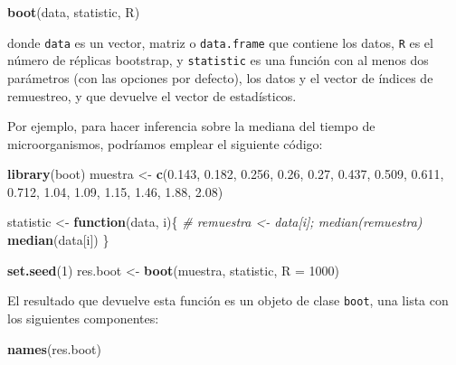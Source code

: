 \documentclass[
]{book}
\newenvironment{Shaded}{\begin{snugshade}}{\end{snugshade}}
\newcommand{\CommentTok}[1]{\textcolor[rgb]{0.56,0.35,0.01}{\textit{#1}}}
\newcommand{\ControlFlowTok}[1]{\textcolor[rgb]{0.13,0.29,0.53}{\textbf{#1}}}
\newcommand{\DataTypeTok}[1]{\textcolor[rgb]{0.13,0.29,0.53}{#1}}
\newcommand{\DecValTok}[1]{\textcolor[rgb]{0.00,0.00,0.81}{#1}}
\newcommand{\FloatTok}[1]{\textcolor[rgb]{0.00,0.00,0.81}{#1}}
\newcommand{\KeywordTok}[1]{\textcolor[rgb]{0.13,0.29,0.53}{\textbf{#1}}}
\newcommand{\NormalTok}[1]{#1}
\newcommand{\StringTok}[1]{\textcolor[rgb]{0.31,0.60,0.02}{#1}}
\theoremstyle{definition}
\theoremstyle{definition}
\theoremstyle{definition}
\theoremstyle{remark}
\begin{document}
\begin{Shaded}
\begin{Highlighting}[]
\KeywordTok{boot}\NormalTok{(data, statistic, R)}
\end{Highlighting}
\end{Shaded}

donde \texttt{data} es un vector, matriz o \texttt{data.frame} que contiene los datos,
\texttt{R} es el número de réplicas bootstrap, y \texttt{statistic} es una función
con al menos dos parámetros (con las opciones por defecto),
los datos y el vector de índices de remuestreo,
y que devuelve el vector de estadísticos.

Por ejemplo, para hacer inferencia sobre la mediana del tiempo de microorganismos,
podríamos emplear el siguiente código:

\begin{Shaded}
\begin{Highlighting}[]
\KeywordTok{library}\NormalTok{(boot)}
\NormalTok{muestra <-}\StringTok{ }\KeywordTok{c}\NormalTok{(}\FloatTok{0.143}\NormalTok{, }\FloatTok{0.182}\NormalTok{, }\FloatTok{0.256}\NormalTok{, }\FloatTok{0.26}\NormalTok{, }\FloatTok{0.27}\NormalTok{, }\FloatTok{0.437}\NormalTok{, }\FloatTok{0.509}\NormalTok{, }
             \FloatTok{0.611}\NormalTok{, }\FloatTok{0.712}\NormalTok{, }\FloatTok{1.04}\NormalTok{, }\FloatTok{1.09}\NormalTok{, }\FloatTok{1.15}\NormalTok{, }\FloatTok{1.46}\NormalTok{, }\FloatTok{1.88}\NormalTok{, }\FloatTok{2.08}\NormalTok{)}

\NormalTok{statistic <-}\StringTok{ }\ControlFlowTok{function}\NormalTok{(data, i)\{}
  \CommentTok{# remuestra <- data[i]; median(remuestra)}
  \KeywordTok{median}\NormalTok{(data[i])}
\NormalTok{\}}

\KeywordTok{set.seed}\NormalTok{(}\DecValTok{1}\NormalTok{)}
\NormalTok{res.boot <-}\StringTok{ }\KeywordTok{boot}\NormalTok{(muestra, statistic, }\DataTypeTok{R =} \DecValTok{1000}\NormalTok{)}
\end{Highlighting}
\end{Shaded}

El resultado que devuelve esta función es un objeto de clase \texttt{boot}, una lista con los siguientes componentes:

\begin{Shaded}
\begin{Highlighting}[]
\KeywordTok{names}\NormalTok{(res.boot)}
\end{Highlighting}
\end{Shaded}
\end{document}
